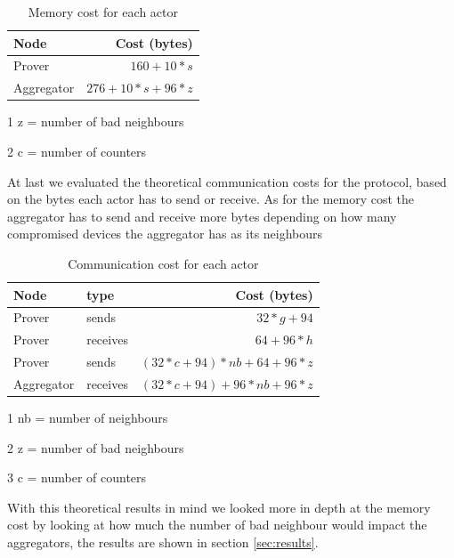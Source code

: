 \documentclass[10pt, a4paper, twocolumn]{article} %
\begin{document}
\begin{table}
	\caption{Memory cost for each actor}
	\centering
	\begin{threeparttable}
	\begin{tabular}{lr}
		\toprule
		Node & Cost (bytes) \\
		\midrule
		Prover & $160+10*s $ \\
		Aggregator & $276+10*s+96*z $ \\
		\bottomrule
	\end{tabular}
	\begin{tablenotes}
		\item[1] z = number of bad neighbours
		\item[2] c = number of counters
		\end{tablenotes} 
	\end{threeparttable}
\end{table}
At last we evaluated the theoretical communication costs for the protocol, based on the bytes each actor has to send or receive.
As for the memory cost the aggregator has to send and receive more bytes depending on how many compromised devices the aggregator has as its neighbours
\begin{table}
	\caption{Communication cost for each actor}
	\centering
	\begin{threeparttable}
	\begin{tabular}{llr}
		\toprule
		Node & type & Cost (bytes) \\
		\midrule
		Prover & sends & $32*g + 94 $ \\
		Prover & receives & $64 + 96 * h $ \\
		Prover & sends & $ (32*c+94)*nb + 64 + 96*z$ \\
		Aggregator & receives & $(32*c+94) + 96* nb + 96*z $ \\
		\bottomrule
	\end{tabular}
	\begin{tablenotes}
		\item[1] nb = number of neighbours
		\item[2] z = number of bad neighbours
		\item[3] c = number of counters  
		\end{tablenotes} 
	\end{threeparttable}
\end{table}

With this theoretical results in mind we looked more in depth at the memory cost by looking at how much the number of bad neighbour would impact the aggregators, the results are shown in section \ref{sec:results}.
\end{document}
